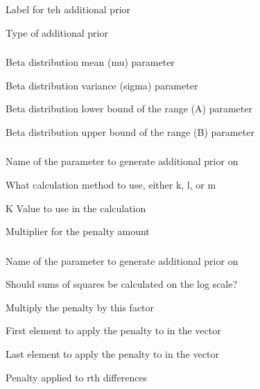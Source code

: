 
 {Label for teh additional prior}

 {Type of additional prior}

\subsubsection[Beta]{}

 {Beta distribution mean (mu) parameter}

 {Beta distribution variance (sigma) parameter}

 {Beta distribution lower bound of the range (A) parameter}

 {Beta distribution upper bound of the range (B) parameter}

\subsubsection[Vector Average]{}

 {Name of the parameter to generate additional prior on}

 {What calculation method to use, either k, l, or m}

 {K Value to use in the calculation}

 {Multiplier for the penalty amount}

\subsubsection[Vector Smoothing]{}

 {Name of the parameter to generate additional prior on}

 {Should sums of squares be calculated on the log scale?}

 {Multiply the penalty by this factor}

 {First element to apply the penalty to in the vector}

 {Last element to apply the penalty to in the vector}

 {Penalty applied to rth differences}

